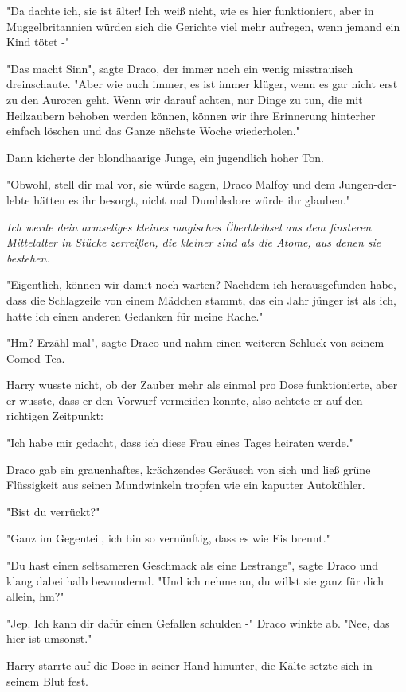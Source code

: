 {"Da dachte ich, sie ist älter! Ich weiß nicht, wie es hier funktioniert, aber in Muggelbritannien würden sich die Gerichte viel mehr aufregen, wenn jemand ein Kind tötet -"

"Das macht Sinn", sagte Draco, der immer noch ein wenig misstrauisch dreinschaute. "Aber wie auch immer, es ist immer klüger, wenn es gar nicht erst zu den Auroren geht. Wenn wir darauf achten, nur Dinge zu tun, die mit Heilzaubern behoben werden können, können wir ihre Erinnerung hinterher einfach löschen und das Ganze nächste Woche wiederholen."

Dann kicherte der blondhaarige Junge, ein jugendlich hoher Ton.

"Obwohl, stell dir mal vor, sie würde sagen, Draco Malfoy und dem Jungen-der-lebte hätten es ihr besorgt, nicht mal Dumbledore würde ihr glauben."

\emph{Ich werde dein armseliges kleines magisches Überbleibsel aus dem finsteren Mittelalter in Stücke zerreißen, die kleiner sind als die Atome, aus denen sie bestehen.}

"Eigentlich, können wir damit noch warten? Nachdem ich herausgefunden habe, dass die Schlagzeile von einem Mädchen stammt, das ein Jahr jünger ist als ich, hatte ich einen anderen Gedanken für meine Rache."

"Hm? Erzähl mal", sagte Draco und nahm einen weiteren Schluck von seinem Comed-Tea.

Harry wusste nicht, ob der Zauber mehr als einmal pro Dose funktionierte, aber er wusste, dass er den Vorwurf vermeiden konnte, also achtete er auf den richtigen Zeitpunkt:

"Ich habe mir gedacht, dass ich diese Frau eines Tages heiraten werde."

Draco gab ein grauenhaftes, krächzendes Geräusch von sich und ließ grüne Flüssigkeit aus seinen Mundwinkeln tropfen wie ein kaputter Autokühler.

"Bist du verrückt?"

"Ganz im Gegenteil, ich bin so vernünftig, dass es wie Eis brennt."

"Du hast einen seltsameren Geschmack als eine Lestrange", sagte Draco und klang dabei halb bewundernd. "Und ich nehme an, du willst sie ganz für dich allein, hm?"

"Jep. Ich kann dir dafür einen Gefallen schulden -" Draco winkte ab. "Nee, das hier ist umsonst."

Harry starrte auf die Dose in seiner Hand hinunter, die Kälte setzte sich in seinem Blut fest.

}

